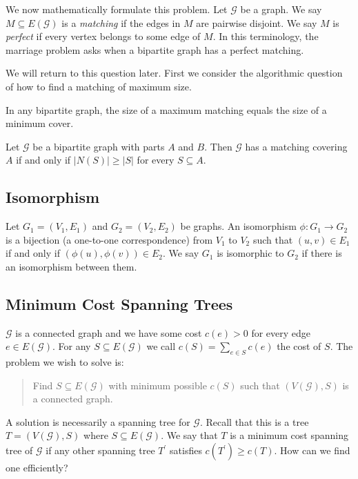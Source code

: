 We now mathematically formulate this problem. Let $\mathcal{G}$ be a graph. We say $M\subseteq E(\mathcal{G})$ is a \emph{matching} if the edges in $M$ are pairwise disjoint. We say $M$ is \emph{perfect} if every vertex belongs to some edge of $M$. 
In this terminology, the marriage problem asks when a bipartite graph has a perfect matching.

We will return to this question later. First we consider the algorithmic question of how to find a matching of maximum size.

\begin{theorem}
In any bipartite graph, the size of a maximum matching equals the size of a minimum cover.
\end{theorem}

\begin{theorem}
Let $\mathcal{G}$ be a bipartite graph with parts $A$ and $B$. Then $\mathcal{G}$ has a matching covering $A$ if and only if $|N(S)|\ge|S|$ for every $S\subseteq A$.
\end{theorem}

\subsection{Isomorphism}
\begin{definition}[Isomorphism]
Let $G_1 = (V_1, E_1)$ and $G_2 = (V_2, E_2)$ be graphs. An isomorphism $\phi : G_1 \to G_2$ is a bijection (a one-to-one correspondence) from $V_1$ to $V_2$ such that $(u,v) \in E_1$ if and only if $(\phi(u),\phi(v)) \in E_2$. We say $G_1$ is isomorphic to $G_2$ if there is an isomorphism between them.
\end{definition}

\subsection{Minimum Cost Spanning Trees}
$\mathcal{G}$ is a connected graph and we have some cost $c(e)>0$ for every edge $e\in E(\mathcal{G})$. For any $S\subseteq E(\mathcal{G})$ we call $c(S)=\sum_{e\in S}c(e)$ the cost of $S$. The problem we wish to solve is:

\begin{quote}
Find $S\subseteq E(\mathcal{G})$ with minimum possible $c(S)$ such that $(V(\mathcal{G}),S)$ is a connected graph.
\end{quote}

A solution is necessarily a spanning tree for $\mathcal{G}$. Recall that this is a tree $T=(V(\mathcal{G}),S)$ where $S\subseteq E(\mathcal{G})$. We say that $T$ is a minimum cost spanning tree of $\mathcal{G}$ if any other spanning tree $T^\prime$ satisfies $c(T^\prime)\ge c(T)$. How can we find one efficiently?

